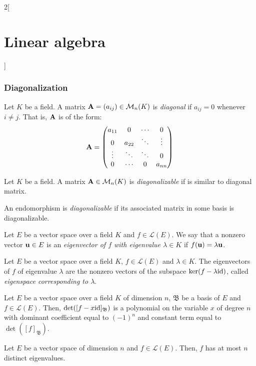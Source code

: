\documentclass[../../../main.tex]{subfiles}
\begin{document}
\begin{multicols}{2}[\section{Linear algebra}]
\subsubsection*{Diagonalization}
\begin{definition}
    Let $K$ be a field. A matrix $\vb{A}=(a_{ij})\in\mathcal{M}_n(K)$ is \textit{diagonal} if $a_{ij}=0$ whenever $i\ne j$. That is, $\vb{A}$ is of the form: 
    $$\vb{A}=
    \begin{pmatrix}
        a_{11} & 0 & \cdots & 0\\
        0 & a_{22} & \ddots & \vdots \\
        \vdots & \ddots & \ddots & 0\\
        0 & \cdots & 0 & a_{nn}
    \end{pmatrix}
    $$
\end{definition}
\begin{definition}
    Let $K$ be a field. A matrix $\vb{A}\in\mathcal{M}_n(K)$ is \textit{diagonalizable} if is similar to diagonal matrix.
\end{definition}
\begin{definition}
    An endomorphism is \textit{diagonalizable} if its associated matrix in some basis is diagonalizable.
\end{definition}
\begin{definition}
    Let $E$ be a vector space over a field $K$ and $f\in\mathcal{L}(E)$. We say that a nonzero vector $\vb{u}\in E$ is an \textit{eigenvector of $f$ with eigenvalue $\lambda\in K$} if $f(\vb{u})=\lambda \vb{u}$.
\end{definition}
\begin{lemma}
    Let $E$ be a vector space over a field $K$, $f\in\mathcal{L}(E)$ and $\lambda\in K$. The eigenvectors of $f$ of eigenvalue $\lambda$ are the nonzero vectors of the subspace $\ker(f-\lambda\mathrm{id})$, called \textit{eigenspace corresponding to $\lambda$}.
\end{lemma}
\begin{lemma}
    Let $E$ be a vector space over a field $K$ of dimension $n$, $\mathfrak{B}$ be a basis of $E$ and $f\in\mathcal{L}(E)$. Then, $\det([f-x\mathrm{id}]_\mathfrak{B})$ is a polynomial on the variable $x$ of degree $n$ with dominant coefficient equal to $(-1)^n$ and constant term equal to $\det([f]_\mathfrak{B})$. 
\end{lemma}
\begin{corollary}
    Let $E$ be a vector space of dimension $n$ and $f\in\mathcal{L}(E)$. Then, $f$ has at most $n$ distinct eigenvalues.

\end{corollary}
\end{multicols}
\end{document}
